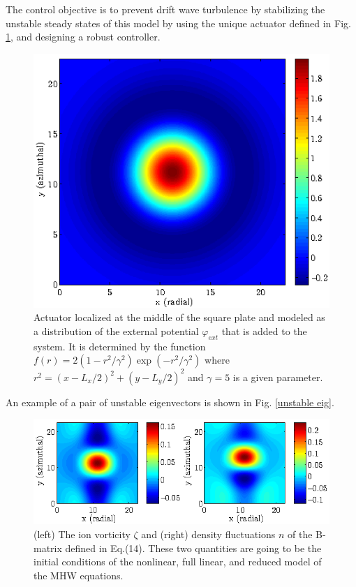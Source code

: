 \documentclass[12pt,lot, lof]{puthesis}
\begin{document}
The control objective is to prevent drift wave turbulence by stabilizing the unstable steady states of this model by using the unique actuator defined in Fig. \ref{actuator}, and designing a robust controller.
\begin{figure}[htb]
\centering
\includegraphics[width=0.7 \linewidth]{B1} 
\caption{Actuator localized at the middle of the square plate and modeled as a distribution of the external potential $\varphi_{ext}$ that is added to the system. It is determined by the function $f(r) = 2 \left(1-r^2/\gamma^2\right) \exp \left(-r^2/\gamma^2\right)$ where $r^2 =\left(x- L_x/2\right)^2 +\left(y- L_y/2\right)^2 $ and $\gamma = 5$ is a given parameter. }
\label{actuator}
\end{figure}
An example of a pair of unstable eigenvectors is shown in Fig. \ref{unstable eig}.
\begin{figure}[htb]
\centering
\includegraphics[width= \linewidth]{BB} 
\caption{(left) The ion vorticity $\zeta$ and (right) density fluctuations $n$ of the B-matrix defined in Eq.(14). These two quantities are going to be the initial conditions of the nonlinear, full linear, and reduced model of the MHW equations. }
\label{BB}
\end{figure}
\end{document}
